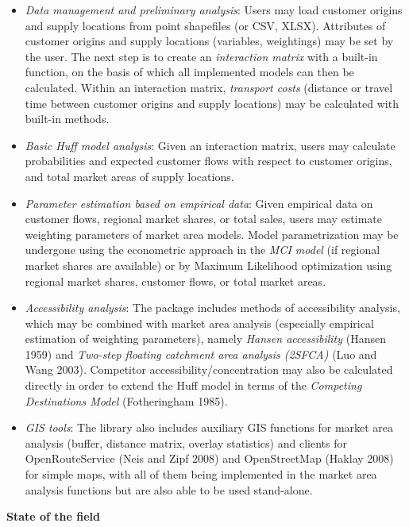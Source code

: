 \documentclass[
]{article}
\begin{document}
\begin{itemize}
\item
  \emph{Data management and preliminary analysis}: Users may load
  customer origins and supply locations from point shapefiles (or CSV,
  XLSX). Attributes of customer origins and supply locations (variables,
  weightings) may be set by the user. The next step is to create an
  \emph{interaction matrix} with a built-in function, on the basis of
  which all implemented models can then be calculated. Within an
  interaction matrix, \emph{transport costs} (distance or travel time
  between customer origins and supply locations) may be calculated with
  built-in methods.
\item
  \emph{Basic Huff model analysis}: Given an interaction matrix, users
  may calculate probabilities and expected customer flows with respect
  to customer origins, and total market areas of supply locations.
\item
  \emph{Parameter estimation based on empirical data}: Given empirical
  data on customer flows, regional market shares, or total sales, users
  may estimate weighting parameters of market area models. Model
  parametrization may be undergone using the econometric approach in the
  \emph{MCI model} (if regional market shares are available) or by
  Maximum Likelihood optimization using regional market shares, customer
  flows, or total market areas.
\item
  \emph{Accessibility analysis}: The package includes methods of
  accessibility analysis, which may be combined with market area
  analysis (especially empirical estimation of weighting parameters),
  namely \emph{Hansen accessibility} (Hansen 1959) and \emph{Two-step
  floating catchment area analysis (2SFCA)} (Luo and Wang 2003).
  Competitor accessibility/concentration may also be calculated directly
  in order to extend the Huff model in terms of the \emph{Competing
  Destinations Model} (Fotheringham 1985).
\item
  \emph{GIS tools}: The library also includes auxiliary GIS functions
  for market area analysis (buffer, distance matrix, overlay statistics)
  and clients for OpenRouteService (Neis and Zipf 2008) and
  OpenStreetMap (Haklay 2008) for simple maps, with all of them being
  implemented in the market area analysis functions but are also able to
  be used stand-alone.
\end{itemize}

\textbf{State of the field}
\end{document}
